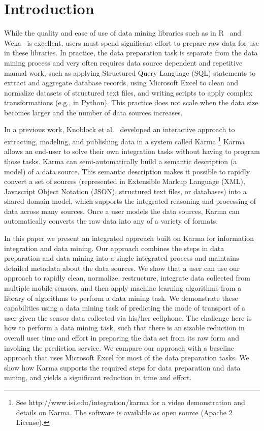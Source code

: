 \section{Introduction}
While the quality and ease of use of data mining libraries such as in R~\cite{R2008} and Weka~\cite{Hall2009} is excellent, users must spend significant effort to prepare raw data for use in these libraries. In practice, the data preparation task is separate from the data mining process and very often requires data source dependent and repetitive manual work, such as applying Structured Query Language (SQL) statements to extract and aggregate database records, using Microsoft Excel to clean and normalize datasets of structured text files, and writing scripts to apply complex transformations (e.g., in Python). This practice does not scale when the data size becomes larger and the number of data sources increases.

In a previous work, Knoblock et al.~\cite{knoblock11:lisc,knoblock12:eswc} developed an interactive approach to extracting, modeling, and publishing data in a system called Karma.\footnote{See http://www.isi.edu/integration/karma for a video demonstration and details on Karma. The software is available as open source (Apache 2 License).} Karma allows an end-user to solve their own integration tasks without having to program those tasks. Karma can semi-automatically build a semantic description (a model) of a data source. This semantic description makes it possible to rapidly convert a set of sources (represented in Extensible Markup Language (XML), Javascript Object Notation (JSON), structured text files, or databases) into a shared domain model, which supports the integrated reasoning and processing of data across many sources. Once a user models the data sources, Karma can automatically converts the raw data into any of a variety of formats.

In this paper we present an integrated approach built on Karma for information integration and data mining. Our approach combines the steps in data preparation and data mining into a single integrated process and maintains detailed metadata about the data sources. We show that a user can use our approach to rapidly clean, normalize, restructure, integrate data collected from multiple mobile sensors, and then apply machine learning algorithms from a library of algorithms to perform a data mining task. We demonstrate these capabilities using a data mining task of predicting the mode of transport of a user given the sensor data collected via his/her cellphone. The challenge here is how to perform a data mining task, such that there is an sizable reduction in overall user time and effort in preparing the data set from its raw form and invoking the prediction service. We compare our approach with a baseline approach that uses Microsoft Excel for most of the data preparation tasks. We show how Karma supports the required steps for data preparation and data mining, and yields a significant reduction in time and effort.

